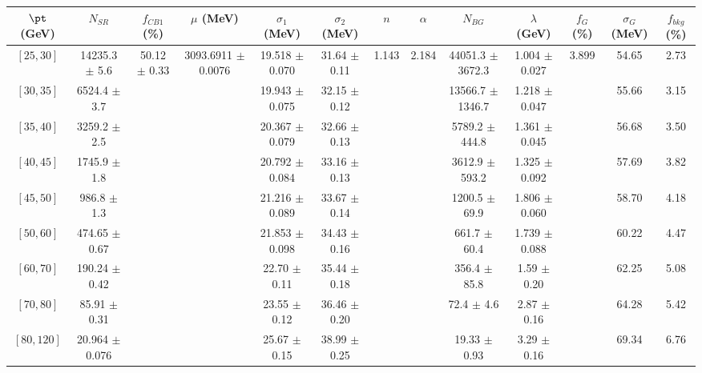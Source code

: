 \begin{tabular}{c||c|c|c|c|c|c|c|c|c|c|c||c}
$\pt$ (GeV) & $N_{SR}$ & $f_{CB1}$ (\%) & $\mu$ (MeV) & $\sigma_1$ (MeV) & $\sigma_2$ (MeV) & $n$ & $\alpha$ & $N_{BG}$ & $\lambda$ (GeV) & $f_G$ (\%) & $\sigma_G$ (MeV) & $f_{bkg}$ (\%) \\
\hline
$[25, 30]$ & 14235.3 $\pm$ 5.6 & \multirow{9}{*}{50.12 $\pm$ 0.33} & \multirow{9}{*}{3093.6911 $\pm$ 0.0076} & 19.518 $\pm$ 0.070 & 31.64 $\pm$ 0.11 & \multirow{9}{*}{1.143} & \multirow{9}{*}{2.184} & 44051.3 $\pm$ 3672.3 & 1.004 $\pm$ 0.027 & \multirow{9}{*}{3.899} & 54.65 & 2.73\\
$[30, 35]$ & 6524.4 $\pm$ 3.7 &  &  & 19.943 $\pm$ 0.075 & 32.15 $\pm$ 0.12 &  &  & 13566.7 $\pm$ 1346.7 & 1.218 $\pm$ 0.047 &  & 55.66 & 3.15\\
$[35, 40]$ & 3259.2 $\pm$ 2.5 &  &  & 20.367 $\pm$ 0.079 & 32.66 $\pm$ 0.13 &  &  & 5789.2 $\pm$ 444.8 & 1.361 $\pm$ 0.045 &  & 56.68 & 3.50\\
$[40, 45]$ & 1745.9 $\pm$ 1.8 &  &  & 20.792 $\pm$ 0.084 & 33.16 $\pm$ 0.13 &  &  & 3612.9 $\pm$ 593.2 & 1.325 $\pm$ 0.092 &  & 57.69 & 3.82\\
$[45, 50]$ & 986.8 $\pm$ 1.3 &  &  & 21.216 $\pm$ 0.089 & 33.67 $\pm$ 0.14 &  &  & 1200.5 $\pm$ 69.9 & 1.806 $\pm$ 0.060 &  & 58.70 & 4.18\\
$[50, 60]$ & 474.65 $\pm$ 0.67 &  &  & 21.853 $\pm$ 0.098 & 34.43 $\pm$ 0.16 &  &  & 661.7 $\pm$ 60.4 & 1.739 $\pm$ 0.088 &  & 60.22 & 4.47\\
$[60, 70]$ & 190.24 $\pm$ 0.42 &  &  & 22.70 $\pm$ 0.11 & 35.44 $\pm$ 0.18 &  &  & 356.4 $\pm$ 85.8 & 1.59 $\pm$ 0.20 &  & 62.25 & 5.08\\
$[70, 80]$ & 85.91 $\pm$ 0.31 &  &  & 23.55 $\pm$ 0.12 & 36.46 $\pm$ 0.20 &  &  & 72.4 $\pm$ 4.6 & 2.87 $\pm$ 0.16 &  & 64.28 & 5.42\\
$[80, 120]$ & 20.964 $\pm$ 0.076 &  &  & 25.67 $\pm$ 0.15 & 38.99 $\pm$ 0.25 &  &  & 19.33 $\pm$ 0.93 & 3.29 $\pm$ 0.16 &  & 69.34 & 6.76\\
\end{tabular}

